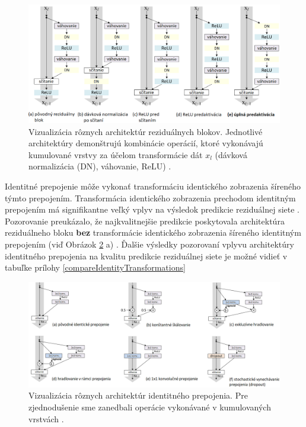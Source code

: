 \begin{figure}
\centerline{\includegraphics[width=1\textwidth]{images/architectures_of_residual_blocks}}
\caption[Vizualizácia rôznych architektúr reziduálnych blokov]{Vizualizácia rôznych architektúr reziduálnych blokov. Jednotlivé architektúry demonštrujú kombinácie operácií, ktoré vykonávajú kumulované vrstvy za účelom transformácie dát $x_l$ (dávková normalizácia (DN), váhovanie, ReLU) \cite{He2016}.}
\label{fig:architectures_of_residual_blocks}
\end{figure}

Identitné prepojenie môže vykonať transformáciu identického zobrazenia šíreného týmto prepojením. Transformácia identického zobrazenia prechodom identitným prepojením má signifikantne veľký vplyv na výsledok predikcie reziduálnej siete \cite{He2016}. Pozorovanie preukázalo, že najkvalitnejšie predikcie poskytovala architektúra reziduálneho bloku \textbf{bez} transformácie identického zobrazenia šíreného identitným prepojením (viď Obrázok \ref{fig:achitectures_of_identity_shortcut} a) \cite{He2016}. Ďalšie výsledky pozorovaní vplyvu architektúry identitného prepojenia na kvalitu predikcie reziduálnej siete je možné vidieť v tabuľke prílohy \ref{compareIdentityTransformations}

\begin{figure}
\centerline{\includegraphics[width=1\textwidth]{images/achitectures_of_identity_shortcut}}
\caption[Vizualizácia rôznych architektúr identitného prepojenia]{Vizualizácia rôznych architektúr identitného prepojenia. Pre zjednodušenie sme zanedbali operácie vykonávané v kumulovaných vrstvách \cite{He2016}.}
\label{fig:achitectures_of_identity_shortcut}
\end{figure}



